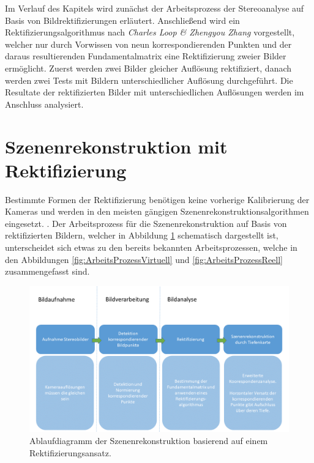 
Im Verlauf des Kapitels wird zunächst der Arbeitsprozess der Stereoanalyse auf Basis von Bildrektifizierungen erläutert. Anschließend wird ein Rektifizierungsalgorithmus nach \textit{Charles Loop \& Zhengyou Zhang}\cite{ZZ} vorgestellt, welcher nur durch Vorwissen von neun korrespondierenden Punkten und der daraus resultierenden Fundamentalmatrix eine Rektifizierung zweier Bilder ermöglicht. Zuerst werden zwei Bilder gleicher Auflösung rektifiziert, danach werden zwei Tests mit Bildern unterschiedlicher Auflösung durchgeführt. Die Resultate der rektifizierten Bilder mit unterschiedlichen Auflösungen werden im Anschluss analysiert.



%

\section{Szenenrekonstruktion mit Rektifizierung}


Bestimmte Formen der Rektifizierung benötigen keine vorherige Kalibrierung der Kameras und werden in den meisten gängigen Szenenrekonstruktionsalgorithmen eingesetzt. \cite{Fusiello,Javier,R.H.}. Der Arbeitsprozess für die Szenenrekonstruktion auf Basis von rektifizierten Bildern, welcher in Abbildung \ref{fig:ArbeitsprozessRektifizierung} schematisch dargestellt ist, unterscheidet sich etwas zu den bereits bekannten Arbeitsprozessen, welche in den Abbildungen \ref{fig:ArbeitsProzessVirtuell} und \ref{fig:ArbeitsProzessReell} zusammengefasst sind.\\


\begin{figure}[!htb]
	\centering
	\includegraphics[width=.9\linewidth]{images/NEU_Rektifizierung_Arbeitsprozess.png}
	\caption[Arbeitsprozess der Szenenrekonstruktion mit Rektifizierung]{Ablaufdiagramm der Szenenrekonstruktion basierend auf einem Rektifizierungsansatz.} 
	\label{fig:ArbeitsprozessRektifizierung}
\end{figure}
\pagebreak


